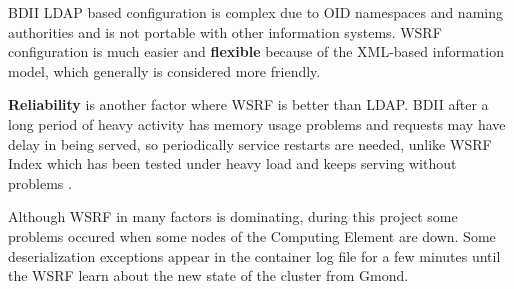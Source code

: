 BDII LDAP based configuration is complex due to OID namespaces and naming authorities and is not portable with other information systems. WSRF configuration is much easier and {\bf flexible} because of the XML-based information model, which generally is considered more friendly.

{\bf Reliability} is another factor where WSRF is better than LDAP. BDII after a long period of heavy activity has memory usage problems and requests may have delay in being served, so periodically service restarts are needed, unlike WSRF Index which has been tested under heavy load and keeps serving without problems \cite{schopf2006monitoring}.

Although WSRF in many factors is dominating, during this project some problems occured when some nodes of the Computing Element are down. Some deserialization exceptions appear in the container log file for a few minutes until the WSRF learn about the new state of the cluster from Gmond.
